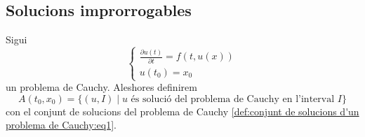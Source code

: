 \documentclass[../Apunts.tex]{subfiles}
\begin{document}
	\subsection{Solucions improrrogables}
	\begin{definition}
		\label{def:conjunt de solucions d'un problema de Cauchy}
		Sigui
		\begin{equation}
			\label{def:conjunt de solucions d'un problema de Cauchy:eq1}
			\begin{cases*}
				\displaystyle \frac{\partial u(t)}{\partial t}=f(t,u(x)) \\
				\displaystyle u(t_{0})=x_{0}
			\end{cases*}
		\end{equation}
		un problema de Cauchy. Aleshores definirem
		\[A(t_{0},x_{0})=\{(u,I)\mid u\text{ és solució del problema de Cauchy en l'interval }I\}\]
		con el conjunt de solucions del problema de Cauchy \eqref{def:conjunt de solucions d'un problema de Cauchy:eq1}.
	\end{definition}
\end{document}
